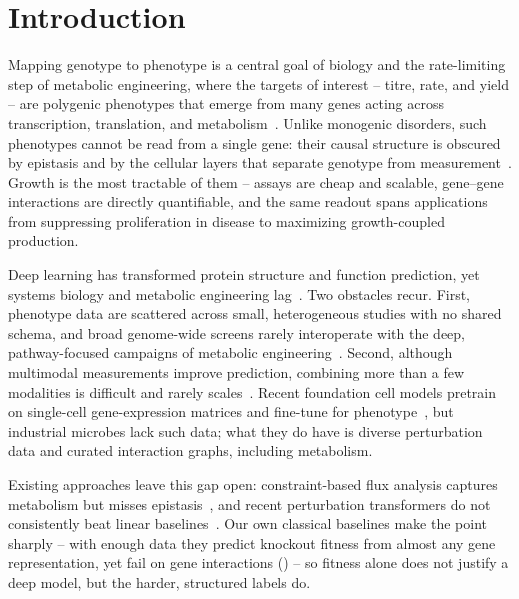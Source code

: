 \section{Introduction}\label{sec:intro}
Mapping genotype to phenotype is a central goal of biology and the rate-limiting step of
metabolic engineering, where the targets of interest -- titre, rate, and yield -- are
polygenic phenotypes that emerge from many genes acting across transcription, translation,
and metabolism~\cite{stephanopoulosMetabolicEngineeringPrinciples1998,bordbarConstraintbasedModelsPredict2014}. Unlike monogenic disorders, such
phenotypes cannot be read from a single gene: their causal structure is obscured by
epistasis and by the cellular layers that separate genotype from
measurement~\cite{costanzoGlobalGeneticInteraction2016a,kuzminSystematicAnalysisComplex2018a}. Growth is the most tractable of
them -- assays are cheap and scalable, gene--gene interactions are directly quantifiable, and
the same readout spans applications from suppressing proliferation in disease to maximizing
growth-coupled production.

Deep learning has transformed protein structure and function prediction, yet systems biology
and metabolic engineering lag~\cite{sapovalCurrentProgressOpen2022}. Two obstacles recur. First, phenotype
data are scattered across small, heterogeneous studies with no shared schema, and broad
genome-wide screens rarely interoperate with the deep, pathway-focused campaigns of metabolic
engineering~\cite{volkMetabolicEngineeringMethodologies2022,presnellSystemsMetabolicEngineering2019}. Second, although multimodal measurements
improve prediction, combining more than a few modalities is difficult and rarely
scales~\cite{culleyMechanismawareMultiomicMachinelearning2020}. Recent foundation cell models pretrain on single-cell
gene-expression matrices and fine-tune for phenotype~\cite{cuiScGPTBuildingFoundation2024,kalfonScPRINTPretraining50MCells2025},
but industrial microbes lack such data; what they do have is diverse perturbation data and
curated interaction graphs, including metabolism.

Existing approaches leave this gap open: constraint-based flux analysis captures metabolism
but misses epistasis~\cite{bordbarConstraintbasedModelsPredict2014,merzbacherAccuratePredictionGene2025}, and recent perturbation
transformers do not consistently beat linear baselines~\cite{ahlmann-eltzeDeeplearningbasedGenePerturbation2025}. Our own
classical baselines make the point sharply -- with enough data they predict knockout fitness
from almost any gene representation, yet fail on gene interactions () -- so
fitness alone does not justify a deep model, but the harder, structured labels do.

